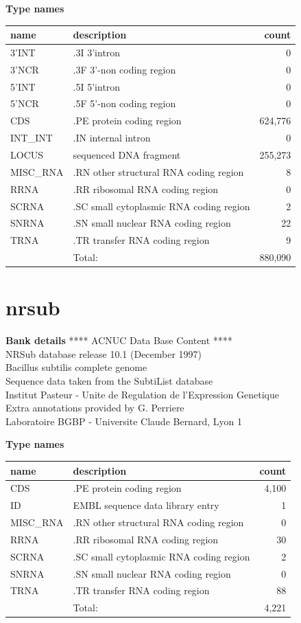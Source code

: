 \documentclass{article}
\begin{document}
\begin{Schunk}
\textbf{Type names}
\noindent\begin{tabular}{llr}
\hline \hline
name & description & count \\
\hline
3'INT  &  .3I 3'intron  &  0 \\
3'NCR  &  .3F  3'-non coding region  &  0 \\
5'INT  &  .5I 5'intron  &  0 \\
5'NCR  &  .5F  5'-non coding region  &  0 \\
CDS  &  .PE protein coding region  &  624,776 \\
INT\_INT  &  .IN  internal intron  &  0 \\
LOCUS  &  sequenced DNA fragment  &  255,273 \\
MISC\_RNA  &  .RN other structural RNA coding region  &  8 \\
RRNA  &  .RR ribosomal RNA coding region  &  0 \\
SCRNA  &  .SC small cytoplasmic RNA coding region  &  2 \\
SNRNA  &  .SN small nuclear RNA coding region  &  22 \\
TRNA  &  .TR transfer RNA coding region  &  9 \\
\hline
 & Total: & 880,090 \\
\hline \hline
\end{tabular}

\section{ nrsub }
\textbf{Bank details}
               ****     ACNUC Data Base Content      ****\\
               NRSub database release 10.1 (December 1997)\\
                    Bacillus subtilis complete genome\\
             Sequence data taken from the SubtiList database\\
     Institut Pasteur - Unite de Regulation de l'Expression Genetique\\
                Extra annotations provided by G. Perriere\\
           Laboratoire BGBP - Universite Claude Bernard, Lyon 1

\textbf{Type names}
\noindent\begin{tabular}{llr}
\hline \hline
name & description & count \\
\hline
CDS  &  .PE protein coding region  &  4,100 \\
ID  &  EMBL sequence data library entry  &  1 \\
MISC\_RNA  &  .RN other structural RNA coding region  &  0 \\
RRNA  &  .RR ribosomal RNA coding region  &  30 \\
SCRNA  &  .SC small cytoplasmic RNA coding region  &  2 \\
SNRNA  &  .SN small nuclear RNA coding region  &  0 \\
TRNA  &  .TR transfer RNA coding region  &  88 \\
\hline
 & Total: & 4,221 \\
\hline \hline
\end{tabular}


\end{Schunk}
\end{document}
